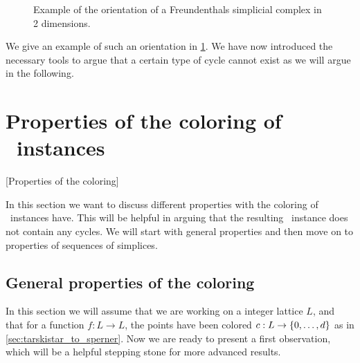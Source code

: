 \begin{figure}[ht]
    \centering
    \caption[Orientation of a simplicial complex]{Example of the orientation of a Freundenthals simplicial complex in 2 dimensions.}
    \label{fig:orientation_of_simplicial_complex}
\end{figure}

We give an example of such an orientation in \cref{fig:orientation_of_simplicial_complex}. We have now introduced the necessary tools to argue that a certain type of cycle cannot exist as we will argue in the following.

\section{Properties of the coloring of \Tarski\ instances}[Properties of the coloring]

In this section we want to discuss different properties with the coloring of \Tarski\ instances have. This will be helpful in arguing that the resulting \EndOfLine\ instance does not contain any cycles. We will start with general properties and then move on to properties of sequences of simplices.

\subsection{General properties of the coloring}

In this section we will assume that we are working on a integer lattice $L$, and that for a function $f : L \rightarrow L$, the points have been colored $c : L \rightarrow \left\{0, \dots, d\right\}$ as in \cref{sec:tarskistar_to_sperner}. Now we are ready to present a first observation, which will be a helpful stepping stone for more advanced results.

